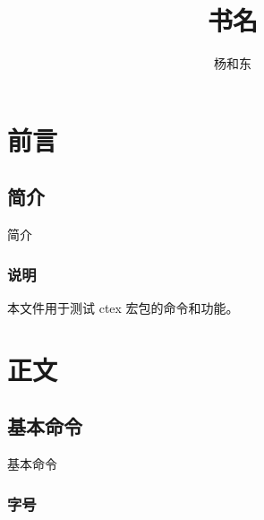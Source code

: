 \documentclass[cs4size,a4paper,fancyhdr,fntef,UTF8,adobefonts,hyperref]{ctexrep}
\begin{document}
\title{书名}
\author{杨和东}
\maketitle
\tableofcontents
\listoftodos[待处理问题]
\part{前言}
\chapter{简介} \label{chapter:intro}
简介
\section{说明}

本文件用于测试 ctex 宏包的命令和功能。
\part{正文}

\chapter{基本命令}

基本命令


\section{字号}





\end{document}
